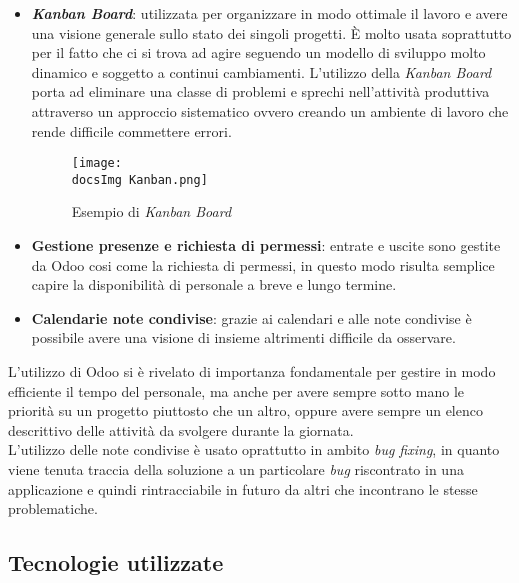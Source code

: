 \begin{itemize}
	\item \textbf{\textit{Kanban Board}}: utilizzata per organizzare in modo ottimale il lavoro e avere una visione generale sullo stato dei singoli progetti. \`E molto usata soprattutto per il fatto che ci si trova ad agire seguendo un modello di sviluppo molto dinamico e soggetto a continui cambiamenti. L'utilizzo della \textit{Kanban Board} porta ad eliminare una classe di problemi e sprechi nell'attivit\`a produttiva attraverso un approccio sistematico ovvero creando un ambiente di lavoro che rende difficile commettere errori.
	
	\begin{figure}[H]
		\centering
		\texttt{[image: \\docsImg Kanban.png]}
		\caption{Esempio di \textit{Kanban Board}}
		\label{fig:Esempio di Kanban Board}
	\end{figure}
	
	\item \textbf{Gestione presenze e richiesta di permessi}: entrate e uscite sono gestite da Odoo cosi come la richiesta di permessi, in questo modo risulta semplice capire la disponibilit\`a di personale a breve e lungo termine.
	
	\item \textbf{Calendarie note condivise}: grazie ai calendari e alle note condivise \`e possibile avere una visione di insieme altrimenti difficile da osservare.	

\end{itemize}
\noindent
L'utilizzo di Odoo si \`e rivelato di importanza fondamentale per gestire in modo efficiente il tempo del personale, ma anche per avere sempre sotto mano le priorit\`a su un progetto piuttosto che un altro, oppure avere sempre un elenco descrittivo delle attivit\`a da svolgere durante la giornata.
\\
L'utilizzo delle note condivise \`e usato oprattutto in ambito \textit{bug fixing}, in quanto viene tenuta traccia della soluzione a un particolare \textit{bug} riscontrato in una applicazione e quindi rintracciabile in futuro da altri che incontrano le stesse problematiche.

\subsection{Tecnologie utilizzate}
